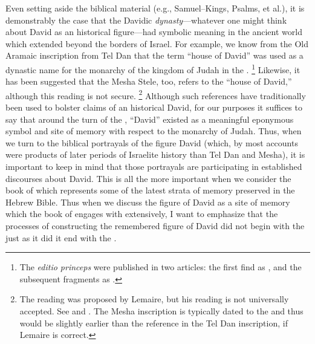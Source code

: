 Even setting aside the biblical material (e.g., Samuel--Kings, Psalms, et al.), it is demonstrably the case that the Davidic \emph{dynasty}---whatever one might think about David as an historical figure---had symbolic meaning in the ancient world which extended beyond the borders of Israel. For example, we know from the Old Aramaic inscription from Tel Dan that the term  ``house of David'' was used as a dynastic name for the monarchy of the kingdom of Judah in the .%
    \footnote{The \emph{editio princeps} were published in two articles: the first find as \cite{biran-naveh_iej1993}, and the subsequent fragments as \cite{biran-naveh_iej1995}.}
Likewise, it has been suggested that the Mesha Stele, too, refers to the ``house of David,'' although this reading is not secure.%
    \footnote{The reading  was proposed by Lemaire, but his reading is not universally accepted. See \cite{lemaire_sel1994} and \cite{lemaire_bar1994}. The Mesha inscription is typically dated to the  and thus would be slightly earlier than the reference in the Tel Dan inscription, if Lemaire is correct.}
Although such references have traditionally been used to bolster claims of an historical David, for our purposes it suffices to say that around the turn of the , ``David'' existed as a meaningful eponymous symbol and site of memory with respect to the monarchy of Judah. Thus, when we turn to the biblical portrayals of the figure David (which, by most accounts were products of later periods of Israelite history than Tel Dan and Mesha), it is important to keep in mind that those portrayals are participating in established discourses about David. This is all the more important when we consider the book of \chronicles which represents some of the latest strata of memory preserved in the Hebrew Bible. Thus when we discuss the figure of David as a site of memory which the book of \chronicles engages with extensively, I want to emphasize that the processes of constructing the remembered figure of David did not begin with the \chronicler just as it did it end with the \chronicler.\autocite{frohlich_frohlich2019}

